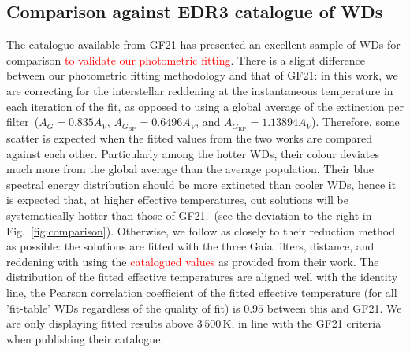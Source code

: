 \documentclass[fleqn,usenatbib]{rasti}
\begin{document}
\subsection{Comparison against EDR3 catalogue of WDs}

The catalogue available from GF21 has presented an excellent sample of WDs for
comparison \textcolor{red}{to validate our photometric fitting}. There is a
slight difference between our photometric fitting methodology and that of GF21:
in this work, we are correcting for the interstellar reddening at the
instantaneous temperature in each iteration of the fit, as opposed to using
a global average of the extinction per filter~($A_{G}=0.835A_{V}$,
$A_{G_{\mathrm{BP}}}=0.6496A_{V}$, and $A_{G_{\mathrm{RP}}}=1.13894A_{V}$). 
Therefore, some scatter is expected when the fitted values from the two works
are compared against each other. Particularly among the hotter WDs, their
colour deviates much more from the global average than the average population.
Their blue spectral energy distribution should be more extincted than cooler
WDs, hence it is expected that, at higher effective temperatures, out solutions
will be systematically hotter than those of GF21.~(see the deviation to the
right in Fig.~\ref{fig:comparison}). Otherwise, we follow as closely to their
reduction method as possible: the solutions are fitted with the three Gaia
filters, distance, and reddening with using the \textcolor{red}{catalogued
values} as provided from their work. The distribution of the fitted effective
temperatures are aligned well with the identity line, the Pearson correlation
coefficient of the fitted effective temperature (for all 'fit-table' WDs
regardless of the quality of fit) is $0.95$ between this and GF21. We are only
displaying fitted results above $3\,500$\,K, in line with the GF21 criteria
when publishing their catalogue.
\end{document}
